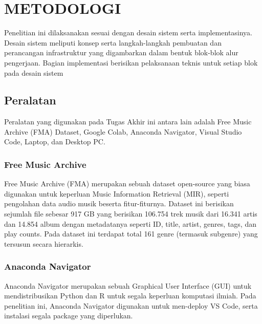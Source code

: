 \chapter{METODOLOGI}
\label{chap:metodologi}


\usetikzlibrary{positioning, fit, calc}   

Penelitian ini dilaksanakan sesuai dengan desain sistem serta implementasinya. Desain sistem meliputi konsep serta langkah-langkah pembuatan dan perancangan infrastruktur yang digambarkan dalam bentuk blok-blok alur pengerjaan. Bagian implementasi berisikan pelaksanaan teknis untuk setiap blok pada desain sistem


\section{Peralatan}
\label{sec:peralatan}

Peralatan yang digunakan pada Tugas Akhir ini antara lain adalah Free Music Archive (FMA) Dataset, Google Colab, Anaconda Navigator, Visual Studio Code, Laptop, dan Desktop PC.

\subsection{Free Music Archive}
\label{subsec:fma}
Free Music Archive (FMA) merupakan sebuah dataset open-source yang biasa digunakan untuk keperluan Music Information Retrieval (MIR), seperti pengolahan data audio musik beserta fitur-fiturnya. Dataset ini berisikan sejumlah file sebesar 917 GB yang berisikan 106.754 trek musik dari 16.341 artis dan 14.854 album dengan metadatanya seperti ID, title, artist, genres, tags, dan play counts. Pada dataset ini terdapat total 161 genre (termasuk subgenre) yang tersusun secara hierarkis\citep{DBLP:journals/corr/BenziDVB16}.

\subsection{Anaconda Navigator}
\label{subsec:anacondanav}
Anaconda Navigator merupakan sebuah Graphical User Interface (GUI) untuk mendistribusikan Python dan R untuk segala keperluan komputasi ilmiah. Pada penelitian ini, Anaconda Navigator digunakan untuk men-deploy VS Code, serta instalasi segala package yang diperlukan.

